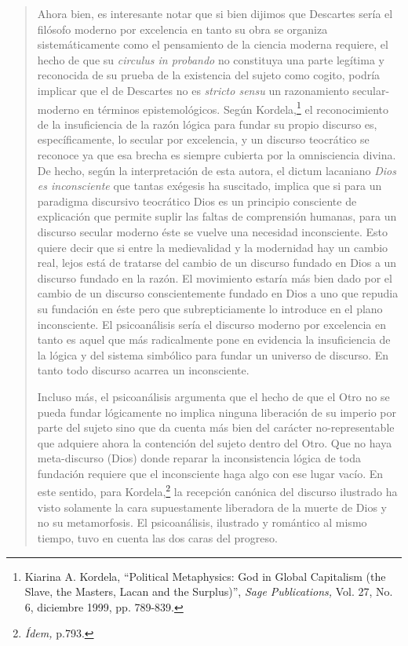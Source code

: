 \begin{quote}
Ahora bien, es interesante notar que si bien dijimos que Descartes sería el filósofo moderno por excelencia en tanto su obra se organiza sistemáticamente como el pensamiento de la ciencia moderna requiere, el hecho de que su \emph{circulus in probando} no constituya una parte legítima y reconocida de su prueba de la existencia del sujeto como cogito, podría implicar que el de Descartes no es \emph{stricto sensu} un razonamiento secular-moderno en términos epistemológicos. Según Kordela,\footnote{Kiarina A. Kordela, \enquote{Political Metaphysics: God in Global Capitalism (the Slave, the Masters, Lacan and the Surplus)}, \emph{Sage Publications,} Vol. 27, No. 6, diciembre 1999, pp. 789-839.} el reconocimiento de la insuficiencia de la razón lógica para fundar su propio discurso es, específicamente, lo secular por excelencia, y un discurso teocrático se reconoce ya que esa brecha es siempre cubierta por la omnisciencia divina. De hecho, según la interpretación de esta autora, el dictum lacaniano \emph{Dios es inconsciente} que tantas exégesis ha suscitado, implica que si para un paradigma discursivo teocrático Dios es un principio consciente de explicación que permite suplir las faltas de comprensión humanas, para un discurso secular moderno éste se vuelve una necesidad inconsciente. Esto quiere decir que si entre la medievalidad y la modernidad hay un cambio real, lejos está de tratarse del cambio de un discurso fundado en Dios a un discurso fundado en la razón. El movimiento estaría más bien dado por el cambio de un discurso conscientemente fundado en Dios a uno que repudia su fundación en éste pero que subrepticiamente lo introduce en el plano inconsciente. El psicoanálisis sería el discurso moderno por excelencia en tanto es aquel que más radicalmente pone en evidencia la insuficiencia de la lógica y del sistema simbólico para fundar un universo de discurso. En tanto todo discurso acarrea un inconsciente.

Incluso más, el psicoanálisis argumenta que el hecho de que el Otro no se pueda fundar lógicamente no implica ninguna liberación de su imperio por parte del sujeto sino que da cuenta más bien del carácter no-representable que adquiere ahora la contención del sujeto dentro del Otro. Que no haya meta-discurso (Dios) donde reparar la inconsistencia lógica de toda fundación requiere que el inconsciente haga algo con ese lugar vacío. En este sentido, para Kordela,\footnote{\emph{Ídem,} p.793.} la recepción canónica del discurso ilustrado ha visto solamente la cara supuestamente liberadora de la muerte de Dios y no su metamorfosis. El psicoanálisis, ilustrado y romántico al mismo tiempo, tuvo en cuenta las dos caras del progreso.


\end{quote}
